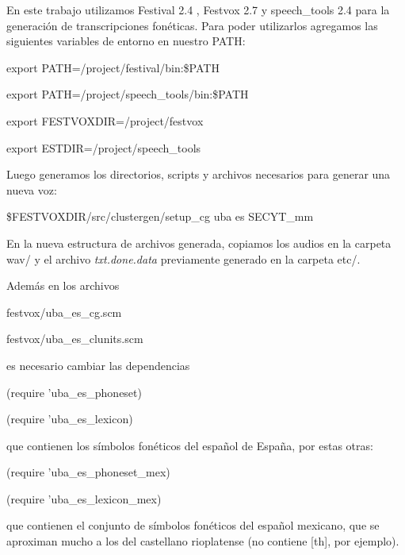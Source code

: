 En este trabajo utilizamos Festival 2.4 \cite{festivalDownload}, Festvox 2.7 \cite{festvoxDownload} y speech\_tools 2.4 \cite{speechToolDownload} para la generación de transcripciones fonéticas. Para poder utilizarlos agregamos las siguientes variables de entorno en nuestro PATH:

\begin{tcolorbox}
export PATH=/project/festival/bin:\$PATH

export PATH=/project/speech\_tools/bin:\$PATH

export FESTVOXDIR=/project/festvox

export ESTDIR=/project/speech\_tools
\end{tcolorbox}

Luego generamos los directorios, scripts y archivos necesarios para generar una nueva voz:
\begin{tcolorbox}
\$FESTVOXDIR/src/clustergen/setup\_cg uba es SECYT\_mm
\end{tcolorbox}

En la nueva estructura de archivos generada, copiamos los audios en la carpeta wav/ y el archivo \textit{txt.done.data} previamente generado en la carpeta etc/.

Además en los archivos 

\begin{tcolorbox}
festvox/uba\_es\_cg.scm 

festvox/uba\_es\_clunits.scm
\end{tcolorbox}

\noindent es necesario cambiar las dependencias 

\begin{tcolorbox}
(require 'uba\_es\_phoneset)

(require 'uba\_es\_lexicon)
\end{tcolorbox}

\noindent que contienen los símbolos fonéticos del español de España, por estas otras:

\begin{tcolorbox}
(require 'uba\_es\_phoneset\_mex)

(require 'uba\_es\_lexicon\_mex)
\end{tcolorbox}

\noindent que contienen el conjunto de símbolos fonéticos del español mexicano, que se aproximan mucho a los del castellano rioplatense (no contiene [th], por ejemplo).


